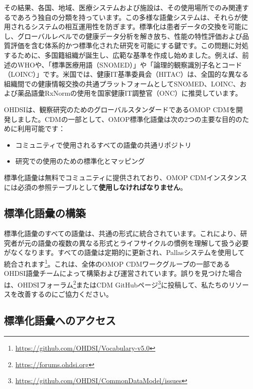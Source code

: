 \documentclass[
  11pt]{book}
\providecommand{\tightlist}{%
  \setlength{\itemsep}{0pt}\setlength{\parskip}{0pt}}
\theoremstyle{definition}
\theoremstyle{definition}
\theoremstyle{definition}
\theoremstyle{definition}
\theoremstyle{remark}
\begin{document}
その結果、各国、地域、医療システムおよび施設は、その使用場所でのみ関連するであろう独自の分類を持っています。この多様な語彙システムは、それらが使用されるシステムの相互運用性を防ぎます。標準化は患者データの交換を可能にし、グローバルレベルでの健康データ分析を解き放ち、性能の特性評価および品質評価を含む体系的かつ標準化された研究を可能にする鍵です。この問題に対処するために、多国籍組織が誕生し、広範な基準を作成し始めました。例えば、前述のWHOや、「標準医療用語（SNOMED）」や「論理的観察識別子名とコード（LOINC）」です。米国では、健康IT基準委員会（HITAC）は、全国的な異なる組織間での健康情報交換の共通プラットフォームとしてSNOMED、LOINC、および薬品語彙RxNormの使用を国家健康IT調整官（ONC）に推奨しています。

OHDSIは、観察研究のためのグローバルスタンダードであるOMOP CDMを開発しました。CDMの一部として、OMOP標準化語彙は次の2つの主要な目的のために利用可能です：

\begin{itemize}
\tightlist
\item
  コミュニティで使用されるすべての語彙の共通リポジトリ
\item
  研究での使用のための標準化とマッピング
\end{itemize}

標準化語彙は無料でコミュニティに提供されており、OMOP CDMインスタンスには必須の参照テーブルとして\textbf{使用しなければなりません}。

\subsection{標準化語彙の構築}\label{ux6a19ux6e96ux5316ux8a9eux5f59ux306eux69cbux7bc9}

標準化語彙のすべての語彙は、共通の形式に統合されています。これにより、研究者が元の語彙の複数の異なる形式とライフサイクルの慣例を理解して扱う必要がなくなります。すべての語彙は定期的に更新され、Pallasシステムを使用して統合されます\footnote{\url{https://github.com/OHDSI/Vocabulary-v5.0}}。これは、全体のOMOP CDMワークグループの一部であるOHDSI語彙チームによって構築および運営されています。誤りを見つけた場合は、OHDSIフォーラム\footnote{\url{https://forums.ohdsi.org}}またはCDM GitHubページ\footnote{\url{https://github.com/OHDSI/CommonDataModel/issues}}に投稿して、私たちのリソースを改善するのにご協力ください。 

\subsection{標準化語彙へのアクセス}\label{accessVocabularies}
\end{document}
